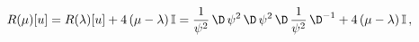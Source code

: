 \begin{equation*}
R(\mu)[u] = R(\lambda)[u] + 4\,(\mu-\lambda)\,{\mathbb{I}}=
\frac{1}{\psi^2}\,\D\,\psi^2\,\D\,\psi^2\,\D\,\frac{1}{\psi^2}\,\D^{-1} +
4\,(\mu-\lambda)\,{\mathbb{I}}\,,
\end{equation*}

